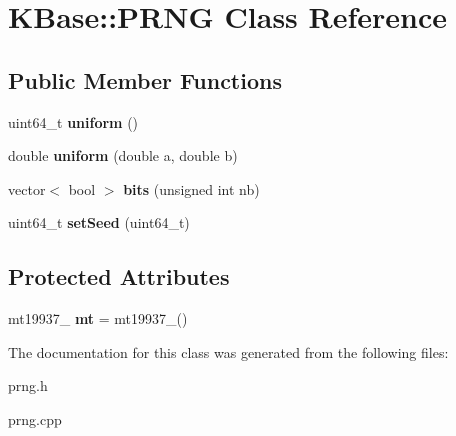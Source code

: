 \hypertarget{class_k_base_1_1_p_r_n_g}{\section{K\-Base\-:\-:P\-R\-N\-G Class Reference}
\label{class_k_base_1_1_p_r_n_g}
}
\subsection*{Public Member Functions}
\begin{DoxyCompactItemize}
\item 
\hypertarget{class_k_base_1_1_p_r_n_g_a46dc1e92993bc3f5c13717a2ea892cb9}{uint64\-\_\-t {\bfseries uniform} ()}\label{class_k_base_1_1_p_r_n_g_a46dc1e92993bc3f5c13717a2ea892cb9}

\item 
\hypertarget{class_k_base_1_1_p_r_n_g_a3d5cc2e611dd7d8c01b84b84be8fd8cf}{double {\bfseries uniform} (double a, double b)}\label{class_k_base_1_1_p_r_n_g_a3d5cc2e611dd7d8c01b84b84be8fd8cf}

\item 
\hypertarget{class_k_base_1_1_p_r_n_g_a4f2b0457ccf0a77f2ded4145a5a61a5e}{vector$<$ bool $>$ {\bfseries bits} (unsigned int nb)}\label{class_k_base_1_1_p_r_n_g_a4f2b0457ccf0a77f2ded4145a5a61a5e}

\item 
\hypertarget{class_k_base_1_1_p_r_n_g_aff129c81bc60399b82f59ff9334cc9f8}{uint64\-\_\-t {\bfseries set\-Seed} (uint64\-\_\-t)}\label{class_k_base_1_1_p_r_n_g_aff129c81bc60399b82f59ff9334cc9f8}

\end{DoxyCompactItemize}
\subsection*{Protected Attributes}
\begin{DoxyCompactItemize}
\item 
\hypertarget{class_k_base_1_1_p_r_n_g_ad5ed2c89c06f6b8d67e978da66f7cdfe}{mt19937\-\_ {\bfseries mt} = mt19937\-\_()}\label{class_k_base_1_1_p_r_n_g_ad5ed2c89c06f6b8d67e978da66f7cdfe}

\end{DoxyCompactItemize}


The documentation for this class was generated from the following files\-:\begin{DoxyCompactItemize}
\item 
prng.\-h\item 
prng.\-cpp\end{DoxyCompactItemize}
